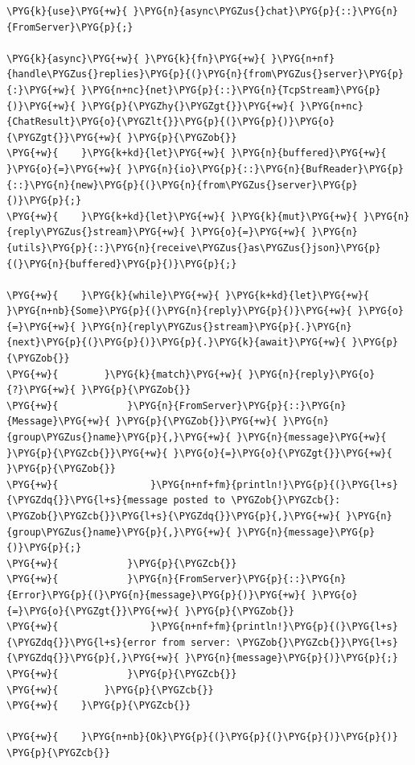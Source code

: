 \begin{Verbatim}[commandchars=\\\{\},breaklines=true,breakanywhere=true,fontsize=\codefont,xleftmargin=17bp]
\PYG{k}{use}\PYG{+w}{ }\PYG{n}{async\PYGZus{}chat}\PYG{p}{::}\PYG{n}{FromServer}\PYG{p}{;}

\PYG{k}{async}\PYG{+w}{ }\PYG{k}{fn}\PYG{+w}{ }\PYG{n+nf}{handle\PYGZus{}replies}\PYG{p}{(}\PYG{n}{from\PYGZus{}server}\PYG{p}{:}\PYG{+w}{ }\PYG{n+nc}{net}\PYG{p}{::}\PYG{n}{TcpStream}\PYG{p}{)}\PYG{+w}{ }\PYG{p}{\PYGZhy{}\PYGZgt{}}\PYG{+w}{ }\PYG{n+nc}{ChatResult}\PYG{o}{\PYGZlt{}}\PYG{p}{(}\PYG{p}{)}\PYG{o}{\PYGZgt{}}\PYG{+w}{ }\PYG{p}{\PYGZob{}}
\PYG{+w}{    }\PYG{k+kd}{let}\PYG{+w}{ }\PYG{n}{buffered}\PYG{+w}{ }\PYG{o}{=}\PYG{+w}{ }\PYG{n}{io}\PYG{p}{::}\PYG{n}{BufReader}\PYG{p}{::}\PYG{n}{new}\PYG{p}{(}\PYG{n}{from\PYGZus{}server}\PYG{p}{)}\PYG{p}{;}
\PYG{+w}{    }\PYG{k+kd}{let}\PYG{+w}{ }\PYG{k}{mut}\PYG{+w}{ }\PYG{n}{reply\PYGZus{}stream}\PYG{+w}{ }\PYG{o}{=}\PYG{+w}{ }\PYG{n}{utils}\PYG{p}{::}\PYG{n}{receive\PYGZus{}as\PYGZus{}json}\PYG{p}{(}\PYG{n}{buffered}\PYG{p}{)}\PYG{p}{;}

\PYG{+w}{    }\PYG{k}{while}\PYG{+w}{ }\PYG{k+kd}{let}\PYG{+w}{ }\PYG{n+nb}{Some}\PYG{p}{(}\PYG{n}{reply}\PYG{p}{)}\PYG{+w}{ }\PYG{o}{=}\PYG{+w}{ }\PYG{n}{reply\PYGZus{}stream}\PYG{p}{.}\PYG{n}{next}\PYG{p}{(}\PYG{p}{)}\PYG{p}{.}\PYG{k}{await}\PYG{+w}{ }\PYG{p}{\PYGZob{}}
\PYG{+w}{        }\PYG{k}{match}\PYG{+w}{ }\PYG{n}{reply}\PYG{o}{?}\PYG{+w}{ }\PYG{p}{\PYGZob{}}
\PYG{+w}{            }\PYG{n}{FromServer}\PYG{p}{::}\PYG{n}{Message}\PYG{+w}{ }\PYG{p}{\PYGZob{}}\PYG{+w}{ }\PYG{n}{group\PYGZus{}name}\PYG{p}{,}\PYG{+w}{ }\PYG{n}{message}\PYG{+w}{ }\PYG{p}{\PYGZcb{}}\PYG{+w}{ }\PYG{o}{=}\PYG{o}{\PYGZgt{}}\PYG{+w}{ }\PYG{p}{\PYGZob{}}
\PYG{+w}{                }\PYG{n+nf+fm}{println!}\PYG{p}{(}\PYG{l+s}{\PYGZdq{}}\PYG{l+s}{message posted to \PYGZob{}\PYGZcb{}: \PYGZob{}\PYGZcb{}}\PYG{l+s}{\PYGZdq{}}\PYG{p}{,}\PYG{+w}{ }\PYG{n}{group\PYGZus{}name}\PYG{p}{,}\PYG{+w}{ }\PYG{n}{message}\PYG{p}{)}\PYG{p}{;}
\PYG{+w}{            }\PYG{p}{\PYGZcb{}}
\PYG{+w}{            }\PYG{n}{FromServer}\PYG{p}{::}\PYG{n}{Error}\PYG{p}{(}\PYG{n}{message}\PYG{p}{)}\PYG{+w}{ }\PYG{o}{=}\PYG{o}{\PYGZgt{}}\PYG{+w}{ }\PYG{p}{\PYGZob{}}
\PYG{+w}{                }\PYG{n+nf+fm}{println!}\PYG{p}{(}\PYG{l+s}{\PYGZdq{}}\PYG{l+s}{error from server: \PYGZob{}\PYGZcb{}}\PYG{l+s}{\PYGZdq{}}\PYG{p}{,}\PYG{+w}{ }\PYG{n}{message}\PYG{p}{)}\PYG{p}{;}
\PYG{+w}{            }\PYG{p}{\PYGZcb{}}
\PYG{+w}{        }\PYG{p}{\PYGZcb{}}
\PYG{+w}{    }\PYG{p}{\PYGZcb{}}

\PYG{+w}{    }\PYG{n+nb}{Ok}\PYG{p}{(}\PYG{p}{(}\PYG{p}{)}\PYG{p}{)}
\PYG{p}{\PYGZcb{}}
\end{Verbatim}

